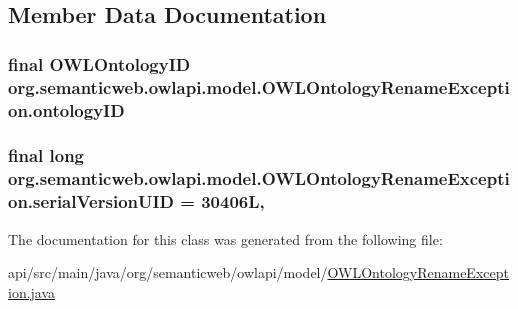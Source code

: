 \subsection{Member Data Documentation}
\hypertarget{classorg_1_1semanticweb_1_1owlapi_1_1model_1_1_o_w_l_ontology_rename_exception_a0666e4a70846bee5270435f6c508cb9d}{
\subsubsection[{ontology\-I\-D}]{\setlength{\rightskip}{0pt plus 5cm}final {\bf O\-W\-L\-Ontology\-I\-D} org.\-semanticweb.\-owlapi.\-model.\-O\-W\-L\-Ontology\-Rename\-Exception.\-ontology\-I\-D\hspace{0.3cm}{\ttfamily [private]}}}\label{classorg_1_1semanticweb_1_1owlapi_1_1model_1_1_o_w_l_ontology_rename_exception_a0666e4a70846bee5270435f6c508cb9d}
\hypertarget{classorg_1_1semanticweb_1_1owlapi_1_1model_1_1_o_w_l_ontology_rename_exception_a7e2449f5883352ae1026eda7ff01d360}{
\subsubsection[{serial\-Version\-U\-I\-D}]{\setlength{\rightskip}{0pt plus 5cm}final long org.\-semanticweb.\-owlapi.\-model.\-O\-W\-L\-Ontology\-Rename\-Exception.\-serial\-Version\-U\-I\-D = 30406\-L\hspace{0.3cm}{\ttfamily [static]}, {\ttfamily [private]}}}\label{classorg_1_1semanticweb_1_1owlapi_1_1model_1_1_o_w_l_ontology_rename_exception_a7e2449f5883352ae1026eda7ff01d360}


The documentation for this class was generated from the following file\-:\begin{DoxyCompactItemize}
\item 
api/src/main/java/org/semanticweb/owlapi/model/\hyperlink{_o_w_l_ontology_rename_exception_8java}{O\-W\-L\-Ontology\-Rename\-Exception.\-java}\end{DoxyCompactItemize}

